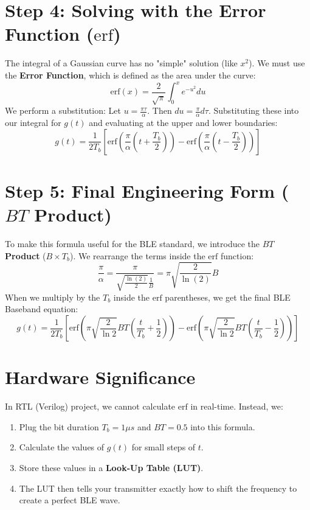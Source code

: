 \documentclass[12pt]{article}
\begin{document}
\section{Step 4: Solving with the Error Function ($\text{erf}$)}
The integral of a Gaussian curve has no "simple" solution (like $x^2$). We must use the \textbf{Error Function}, which is defined as the area under the curve:
\begin{equation}
\text{erf}(x) = \frac{2}{\sqrt{\pi}} \int_0^x e^{-u^2} du
\end{equation}
We perform a substitution: Let $u = \frac{\pi \tau}{\alpha}$. Then $du = \frac{\pi}{\alpha} d\tau$.
Substituting these into our integral for $g(t)$ and evaluating at the upper and lower boundaries:
\begin{equation}
g(t) = \frac{1}{2T_b} \left[ \text{erf}\left( \frac{\pi}{\alpha} \left( t + \frac{T_b}{2} \right) \right) - \text{erf}\left( \frac{\pi}{\alpha} \left( t - \frac{T_b}{2} \right) \right) \right]
\end{equation}

\section{Step 5: Final Engineering Form ($BT$ Product)}
To make this formula useful for the BLE standard, we introduce the \textbf{$BT$ Product} ($B \times T_b$). We rearrange the terms inside the $\text{erf}$ function:
\begin{equation}
\frac{\pi}{\alpha} = \frac{\pi}{\sqrt{\frac{\ln(2)}{2}} \frac{1}{B}} = \pi \sqrt{\frac{2}{\ln(2)}} B
\end{equation}
When we multiply by the $T_b$ inside the $\text{erf}$ parentheses, we get the final BLE Baseband equation:
\begin{equation}
g(t) = \frac{1}{2T_b} \left[ \text{erf}\left( \pi \sqrt{\frac{2}{\ln 2}} BT \left( \frac{t}{T_b} + \frac{1}{2} \right) \right) - \text{erf}\left( \pi \sqrt{\frac{2}{\ln 2}} BT \left( \frac{t}{T_b} - \frac{1}{2} \right) \right) \right]
\end{equation}

\section{Hardware Significance}
In RTL (Verilog) project, we cannot calculate $\text{erf}$ in real-time. Instead, we:
\begin{enumerate}
    \item Plug the bit duration $T_b = 1\mu s$ and $BT = 0.5$ into this formula.
    \item Calculate the values of $g(t)$ for small steps of $t$.
    \item Store these values in a \textbf{Look-Up Table (LUT)}.
    \item The LUT then tells your transmitter exactly how to shift the frequency to create a perfect BLE wave.
\end{enumerate}
\end{document}
